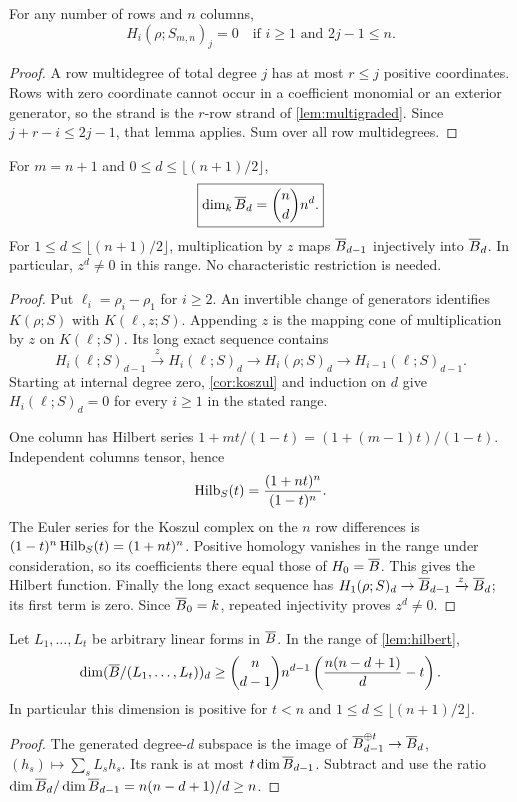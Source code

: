 \begin{corollary}\label{cor:koszul}
For any number of rows and $n$ columns,
\[
 H_i(\rho;S_{m,n})_j=0
 \quad\text{if }i\ge1\text{ and }2j-1\le n.
\]
\end{corollary}
\begin{proof}
A row multidegree of total degree $j$ has at most $r\le j$ positive coordinates. Rows with zero coordinate cannot occur in a coefficient monomial or an exterior generator, so the strand is the $r$-row strand of \cref{lem:multigraded}. Since $j+r-i\le2j-1$, that lemma applies. Sum over all row multidegrees.
\end{proof}

\begin{lemma}\label{lem:hilbert}
For $m=n+1$ and $0\le d\le\lfloor(n+1)/2\rfloor$,
\[
 \boxed{\dim_k\overline B_d=\binom nd n^d.}
\]
For $1\le d\le\lfloor(n+1)/2\rfloor$, multiplication by $z$ maps $\overline B_{d-1}$ injectively into $\overline B_d$. In particular, $z^d\ne0$ in this range. No characteristic restriction is needed.
\end{lemma}
\begin{proof}
Put $\ell_i=\rho_i-\rho_1$ for $i\ge2$. An invertible change of generators identifies $K(\rho;S)$ with $K(\ell,z;S)$. Appending $z$ is the mapping cone of multiplication by $z$ on $K(\ell;S)$. Its long exact sequence contains
\[
 H_i(\ell;S)_{d-1}\xrightarrow{z}H_i(\ell;S)_d
 \longrightarrow H_i(\rho;S)_d
 \longrightarrow H_{i-1}(\ell;S)_{d-1}.
\]
Starting at internal degree zero, \cref{cor:koszul} and induction on $d$ give $H_i(\ell;S)_d=0$ for every $i\ge1$ in the stated range.

One column has Hilbert series $1+mt/(1-t)=(1+(m-1)t)/(1-t)$. Independent columns tensor, hence
\[
 \operatorname{Hilb}_S(t)=\frac{(1+nt)^n}{(1-t)^n}.
\]
The Euler series for the Koszul complex on the $n$ row differences is $(1-t)^n\operatorname{Hilb}_S(t)=(1+nt)^n$. Positive homology vanishes in the range under consideration, so its coefficients there equal those of $H_0=\overline B$. This gives the Hilbert function. Finally the long exact sequence has
$H_1(\rho;S)_d\to\overline B_{d-1}\xrightarrow{z}\overline B_d$; its first term is zero. Since $\overline B_0=k$, repeated injectivity proves $z^d\ne0$.
\end{proof}

\begin{lemma}\label{lem:weakcount}
Let $L_1,\ldots,L_t$ be arbitrary linear forms in $\overline B$. In the range of \cref{lem:hilbert},
\[
 \dim(\overline B/(L_1,\ldots,L_t))_d
 \ge \binom n{d-1}n^{d-1}
 \left(\frac{n(n-d+1)}d-t\right).
\]
In particular this dimension is positive for $t<n$ and $1\le d\le\lfloor(n+1)/2\rfloor$.
\end{lemma}
\begin{proof}
The generated degree-$d$ subspace is the image of
$\overline B_{d-1}^{\oplus t}\to\overline B_d$, $(h_s)\mapsto\sum_sL_sh_s$.
Its rank is at most $t\dim\overline B_{d-1}$. Subtract and use the ratio
$\dim\overline B_d/\dim\overline B_{d-1}=n(n-d+1)/d\ge n$.
\end{proof}

